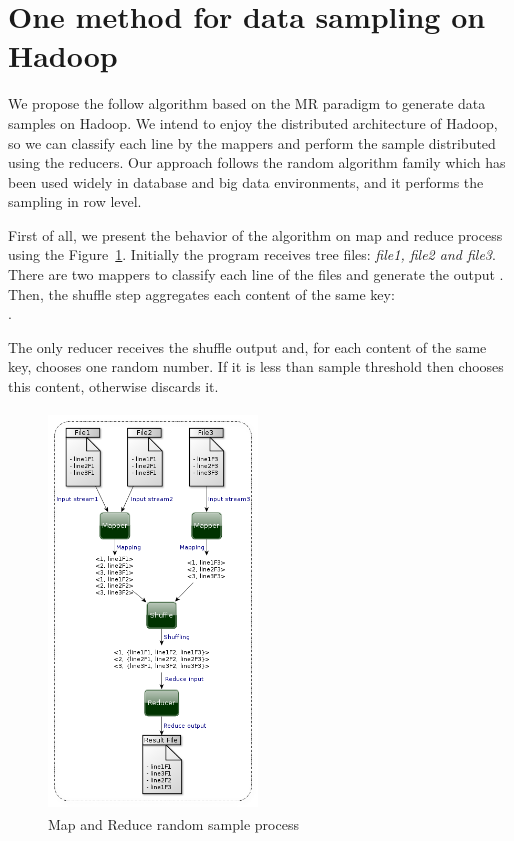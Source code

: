 \section{One method for data sampling on Hadoop}

We propose the follow algorithm based on the MR paradigm to generate data
samples on Hadoop. We intend to enjoy the distributed architecture of Hadoop, so
we can classify each line by the mappers and perform the sample distributed using
the reducers. Our approach follows the random algorithm family which has been used
widely in database and big data environments, and it performs the sampling in row
level.

First of all, we present the behavior of the algorithm on map and reduce process
using the Figure~\ref{fig:sampleProcess}. Initially the program receives tree files:
{\it file1, file2 and file3}. There are two mappers to classify each line of the files
and generate the output . Then, the shuffle step
aggregates each content of the same key:\\
.

The only reducer receives the shuffle output and, for each content of the same key,
chooses one random number. If it is less than sample threshold then chooses this
content, otherwise discards it.

\begin{figure}[htbp]
	\centering
	\includegraphics[width=210px,height=400px]{img/sampleProcess.png}
	\caption{Map and Reduce random sample process}\label{fig:sampleProcess}
\end{figure}

